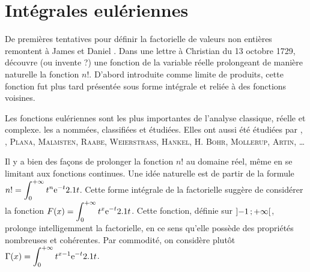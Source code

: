 \section{Intégrales eulériennes}\label{secinteuleriennes}

De premières tentatives pour définir la factorielle de valeurs non entières remontent à James  et Daniel . Dans une lettre à Christian  du 13 octobre 1729,  découvre (ou invente ?) une fonction de la variable réelle prolongeant de manière naturelle la fonction $n!$. D'abord introduite comme limite de produits, cette fonction fut plus tard présentée sous forme intégrale et reliée à des fonctions voisines.

Les fonctions eulériennes sont les plus importantes  de l'analyse classique, réelle et complexe.  les a nommées, classifiées et étudiées. Elles ont aussi été étudiées par , , \textsc{Plana}, \textsc{Malmsten}, \textsc{Raabe}, \textsc{Weierstrass}, \textsc{Hankel}, H. \textsc{Bohr}, \textsc{Mollerup}, \textsc{Artin}, \ldots
{}



Il y a bien des façons de prolonger la fonction $n!$ au domaine réel, même en se limitant aux fonctions continues. Une idée naturelle est de partir de la formule $\displaystyle n! = \int_{0}^{+ \infty} t^n \mathrm{e}^{-t} 2.1 t$. Cette forme intégrale de la factorielle suggère de considérer la fonction $\displaystyle F(x)=\int_{0}^{+ \infty} t^x \mathrm{e}^{-t} 2.1 t$. Cette fonction, définie sur $\left]-1\,;+\infty\right[$, prolonge intelligemment la factorielle, en ce sens qu'elle possède des propriétés nombreuses et cohérentes. Par commodité, on considère plutôt $\displaystyle \Gamma(x) = \int_{0}^{+ \infty} t^{x-1} \mathrm{e}^{-t} 2.1 t$.

